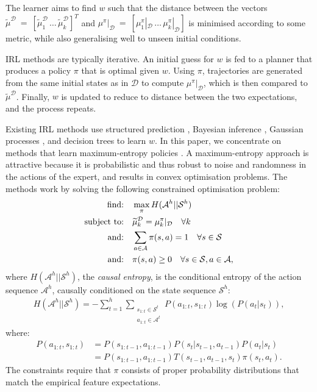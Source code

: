 \documentclass{aamas2016}
\begin{document}
The learner aims to find $w$ such that the distance between the vectors $\widetilde\mu^{\mathcal{D}}~=~[\widetilde\mu^{\mathcal{D}}_1\,\ldots\,\widetilde\mu^{\mathcal{D}}_k]^T$ and $\mu^{\pi}|_{\mathcal{D}}~=~[\mu^{\pi}_1|_{\mathcal{D}}\,\ldots\,\mu^{\pi}_k|_{\mathcal{D}}]$ is minimised according to some metric, while also generalising well to unseen initial conditions.

IRL methods are typically iterative. An initial guess for $w$ is fed to a planner that produces a policy $\pi$ that is optimal given $w$.  Using $\pi$, trajectories are generated from the same initial states as in $\mathcal{D}$ to compute $\mu^{\pi}|_{\mathcal{D}}$, which is then compared to $\widetilde{\mu}^{\mathcal{D}}$.  Finally, $w$ is updated to reduce to distance between the two expectations, and the process repeats.

Existing IRL methods use structured prediction \cite{ratliff2006maximum}, Bayesian inference \cite{ramachandran2007bayesian,dimitrakakis2012bayesian}, Gaussian processes \cite{levine2011nonlinear}, and decision trees \cite{ratliff2007boosting} to learn $w$.  In this paper, we concentrate on methods that learn maximum-entropy policies \cite{ziebart2008maximum,ziebart2010modelingthesis}.  A maximum-entropy approach is attractive because it is probabilistic and thus robust to noise and randomness in the actions of the expert, and results in convex optimisation problems. The methods work by solving the following constrained optimisation problem:
\begin{align}
	\hbox{find:} &\quad\max\limits_{\pi} H(\mathcal{A}^h||\mathcal{S}^h)\label{eq:primal_obj}\\
\hbox{subject to:}&\quad\widetilde{\mu}^{\mathcal{D}}_k   = \mu^{\pi}_k|_{\mathcal{D}}\quad\forall k \label{eq:features_equality_constraint}\\
\hbox{and:} &\quad\sum_{a\in\mathcal{A}}\pi(s,a)  = 1\quad\forall s\in\mathcal{S}\\
\hbox{and:} &\quad\pi(s,a) \geq 0\quad\forall s\in\mathcal{S},a\in\mathcal{A},\label{eq:positive_policy}
\end{align}
where $H(\mathcal{A}^h||\mathcal{S}^h)$, the \emph{causal entropy}, is the conditional entropy of the action sequence $\mathcal{A}^h$, causally conditioned on the state sequence $\mathcal{S}^h$:
\begin{align}
H(\mathcal{A}^h||\mathcal{S}^h) = -\sum_{t=1}^h \sum_{\substack{s_{1:t}\in\mathcal{S}^t\\a_{1:t}\in\mathcal{A}^t}} P(a_{1:t},s_{1:t})\log(P(a_t|s_t)),
\label{eg:entdef}
\end{align}
where:
\begin{align*}
  P(a_{1:t},s_{1:t})&= P(s_{1:t-1},a_{1:t-1})P(s_t|s_{t-1},a_{t-1})P(a_t|s_t)\\
  &=P(s_{1:t-1},a_{1:t-1})T(s_{t-1},a_{t-1},s_t)\pi(s_t,a_t).
\end{align*}
The constraints require that $\pi$ consists of proper probability distributions that match the empirical feature expectations.
\end{document}
